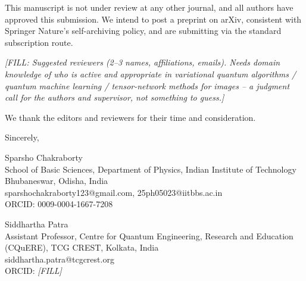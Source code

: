 \documentclass[11pt]{article}
\begin{document}
\smallskip
\noindent This manuscript is not under review at any other journal, and all authors have approved this submission. We intend to post a preprint on arXiv, consistent with Springer Nature's self-archiving policy, and are submitting via the standard subscription route.

\bigskip
\noindent \emph{[FILL: Suggested reviewers (2--3 names, affiliations, emails). Needs domain knowledge of who is active and appropriate in variational quantum algorithms / quantum machine learning / tensor-network methods for images -- a judgment call for the authors and supervisor, not something to guess.]}

\bigskip
\noindent We thank the editors and reviewers for their time and consideration.

\bigskip
\noindent Sincerely,

\bigskip
\noindent Sparsho Chakraborty \\
School of Basic Sciences, Department of Physics, Indian Institute of Technology Bhubaneswar, Odisha, India \\
sparshochakraborty123@gmail.com, 25ph05023@iitbbs.ac.in \\
ORCID: 0009-0004-1667-7208

\bigskip
\noindent Siddhartha Patra \\
Assistant Professor, Centre for Quantum Engineering, Research and Education (CQuERE), TCG CREST, Kolkata, India \\
siddhartha.patra@tcgcrest.org \\
ORCID: \emph{[FILL]}
\end{document}
